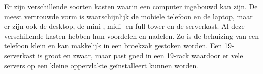 Er zijn verschillende soorten kasten waarin een computer ingebouwd kan zijn. De meest vertrouwde vorm is waarschijnlijk de mobiele telefoon en de laptop, maar er zijn ook de desktop, de mini-, midi- en full-tower en de serverkast. Al deze verschillende kasten hebben hun voordelen en nadelen. Zo is de behuizing van een telefoon klein en kan makkelijk in een broekzak gestoken worden. Een 19\inchQ-serverkast is groot en zwaar, maar past goed in een 19\inchQ-rack waardoor er vele servers op een kleine oppervlakte ge\"installeert kunnen worden.
